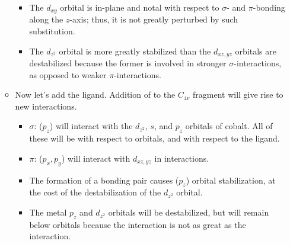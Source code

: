 \documentclass[../notes.tex]{subfiles}
\begin{document}
\begin{itemize}
\begin{itemize}
\begin{itemize}
            \item The $d_{xy}$ orbital is in-plane and notal with respect to $\sigma$- and $\pi$-bonding along the $z$-axis; thus, it is not greatly perturbed by such substitution.
            \item The $d_{z^2}$ orbital is more greatly stabilized than the $d_{xz,yz}$ orbitals are destabilized because the former is involved in stronger $\sigma$-interactions, as opposed to weaker $\pi$-interactions.
        \end{itemize}
        \item Now let's add the  ligand. Addition of  to the $C_{4v}$ fragment will give rise to new interactions.
        \begin{itemize}
            \item $\sigma$: ($p_z$) will interact with the $d_{z^2}$, $s$, and $p_z$ orbitals of cobalt. All of these will be  with respect to  orbitals, and  with respect to the ligand.
            \item $\pi$: ($p_x,p_y$) will interact with $d_{xz,yz}$ in  interactions.
            \item The formation of a bonding pair causes ($p_z$) orbital stabilization, at the cost of the destabilization of the $d_{z^2}$ orbital.
            \item The metal $p_z$ and $d_{z^2}$ orbitals will be destabilized, but will remain below  orbitals because the  interaction is not as great as the  interaction.
        \end{itemize}
    \end{itemize}
\end{itemize}
\end{document}
